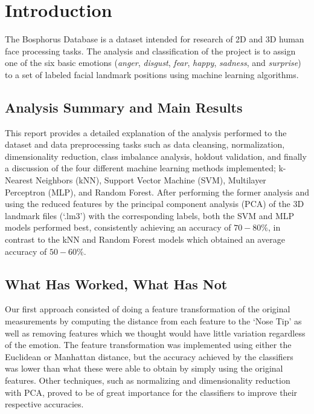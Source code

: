 \section{Introduction}

The Bosphorus Database is a dataset intended for research of 2D and 3D human face processing tasks. The analysis and classification of the project is to assign one of the six basic emotions (\textit{anger}, \textit{disgust}, \textit{fear}, \textit{happy}, \textit{sadness}, and \textit{surprise}) to a set of labeled facial landmark positions using machine learning algorithms.

\subsection{Analysis Summary and Main Results} \label{intro:analysis-summary-and-main-results}
This report provides a detailed explanation of the analysis performed to the dataset and data preprocessing tasks such as data cleansing, normalization, dimensionality reduction, class imbalance analysis, holdout validation, and finally a discussion of the four different machine learning methods implemented; k-Nearest Neighbors (kNN), Support Vector Machine (SVM), Multilayer Perceptron (MLP), and Random Forest. After performing the former analysis and using the reduced features by the principal component analysis (PCA) of the 3D landmark files (`.lm3') with the corresponding labels, both the SVM and MLP models performed best, consistently achieving an accuracy of $70-80\%$, in contrast to the kNN and Random Forest models which obtained an average accuracy of $50-60\%$.

\subsection{What Has Worked, What Has Not} \label{intro:what-has-worked-what-has-not}
Our first approach consisted of doing a feature transformation of the original measurements by computing the distance from each feature to the `Nose Tip' as well as removing features which we thought would have little variation regardless of the emotion. The feature transformation was implemented using either the Euclidean or Manhattan distance, but the accuracy achieved by the classifiers was lower than what these were able to obtain by simply using the original features. Other techniques, such as normalizing and dimensionality reduction with PCA, proved to be of great importance for the classifiers to improve their respective accuracies.

